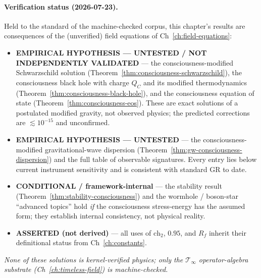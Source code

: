 \paragraph{Verification status (2026-07-23).}
Held to the standard of the machine-checked corpus, this chapter's results are consequences of the (unverified) field equations of Ch~\ref{ch:field-equations}:
\begin{itemize}
\item \textbf{EMPIRICAL HYPOTHESIS --- UNTESTED / NOT INDEPENDENTLY VALIDATED} --- the consciousness-modified Schwarzschild solution (Theorem~\ref{thm:consciousness-schwarzschild}), the consciousness black hole with charge $Q_C$ and its modified thermodynamics (Theorem~\ref{thm:consciousness-black-hole}), and the consciousness equation of state (Theorem~\ref{thm:consciousness-eos}). These are exact solutions of a postulated modified gravity, not observed physics; the predicted corrections are $\lesssim10^{-15}$ and unconfirmed.
\item \textbf{EMPIRICAL HYPOTHESIS --- UNTESTED} --- the consciousness-modified gravitational-wave dispersion (Theorem~\ref{thm:gw-consciousness-dispersion}) and the full table of observable signatures. Every entry lies below current instrument sensitivity and is consistent with standard GR to date.
\item \textbf{CONDITIONAL / framework-internal} --- the stability result (Theorem~\ref{thm:stability-consciousness}) and the wormhole / boson-star ``advanced topics'' hold \emph{if} the consciousness stress-energy has the assumed form; they establish internal consistency, not physical reality.
\item \textbf{ASSERTED (not derived)} --- all uses of $\text{ch}_2$, $0.95$, and $R_f$ inherit their definitional status from Ch~\ref{ch:constants}.
\end{itemize}
\emph{None of these solutions is kernel-verified physics; only the $\mathcal{T}_\infty$ operator-algebra substrate (Ch~\ref{ch:timeless-field}) is machine-checked.}

